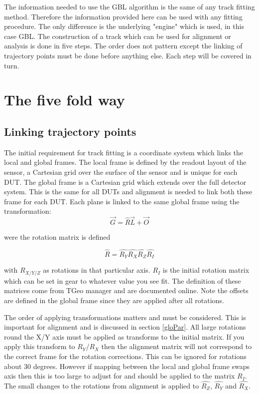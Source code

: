 The information needed to use the GBL algorithm is the same of any track fitting method. Therefore the information provided here can be used with any fitting procedure. The only difference is the underlying "engine" which is used, in this case GBL. The construction of a track which can be used for alignment or analysis is done in five steps. The order does not pattern except the linking of trajectory points must be done before anything else. Each step will be covered in turn. 
\section{The five fold way}
\subsection{Linking trajectory points}
The initial requirement for track fitting is a coordinate system which links the local and global frames. The local frame is defined by the readout layout of the sensor, a Cartesian grid over the surface of the sensor and is unique for each DUT. The global frame is a Cartesian grid which extends over the full detector system. This is the same for all DUTs and alignment is needed to link both these frame for each DUT. Each plane is linked to the same global frame using the transformation:
\begin{equation}
 \overrightarrow{G} =   \hat{R}\overrightarrow{L} +  \overrightarrow{O}
\end{equation}

were the rotation matrix is defined

\begin{equation}
 \hat{R} = \hat{R_Y}\hat{R_X}\hat{R_Z}\hat{R_I}
\end{equation}

with $R_{X/Y/Z}$ as rotations in that particular axis. $R_I$ is the initial rotation matrix which can be set in gear to whatever value you see fit. The definition of these matrices come from TGeo manager and are documented online. Note the offsets are defined in the global frame since they are applied after all rotations. 

The order of applying transformations matters and must be considered. This is important for alignment and is discussed in section \ref{gloPar}. All large rotations round the X/Y axis must be applied as transforms to the initial matrix. If you apply this transform to $R_Y$/$R_X$ then the alignment matrix will not correspond to the correct frame for the rotation corrections. This can be ignored for rotations about 30 degrees. However if mapping between the local and global frame swaps axis then this is too large to adjust for and should be applied to the matrix $R_I$. The small changes to the rotations from alignment is applied to $\hat{R_Z}$,  $\hat{R_Y}$ and $\hat{R_X}$.


